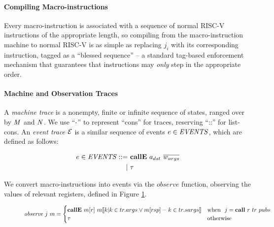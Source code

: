 \documentclass[10pt,conference]{ieeetran}%
\theoremstyle{definition}
\begin{document}
\paragraph*{Compiling Macro-instructions}

Every macro-instruction is associated with a sequence of normal RISC-V instructions
of the appropriate length, so compiling from the macro-instruction machine to normal
RISC-V is as simple as replacing \(j_i\) with its corresponding instruction, tagged
as a ``blessed sequence'' -- a standard tag-based enforcement mechanism that guarantees
that instructions may {\it only} step in the appropriate order.

\paragraph*{Machine and Observation Traces}
\label{sec:traces}

A {\em machine trace} is a nonempty, finite or infinite sequence
of states, ranged over by \(\mathit{M}\) and \(\mathit{N}\).
We use ``\(\cdot\)'' to represent ``cons'' for traces, reserving ``::''
for list-cons. An {\em event trace} \(\mathcal{E}\) is a similar sequence of
events \(e \in \mathit{EVENTS}\), which are defined as follows:

\[\begin{split}
e \in \mathit{EVENTS} ::= & ~ \mathbf{callE} ~ a_{dst} ~ \overline{w_{args}} \\
| & ~ \tau \\
\end{split}\]


We convert macro-instructions into events via the \(\mathit{observe}\)
function, observing the values of relevant registers, defined in Figure \ref{fig:observe}.

\begin{figure*}
\[\mathit{observe} ~ j ~ m =
\begin{cases}
  \mathbf{callE} ~ m[r] ~ m \llbracket k | k \in tr.args \lor m[rsp] - k \in tr.sargs \rrbracket
  & \textnormal{when } ~ j = \mathbf{call} ~ r ~ tr ~ pubs \\
  \tau & \textnormal{otherwise} \\
\end{cases}\]
\label{fig:observe}
\end{figure*}
\end{document}
